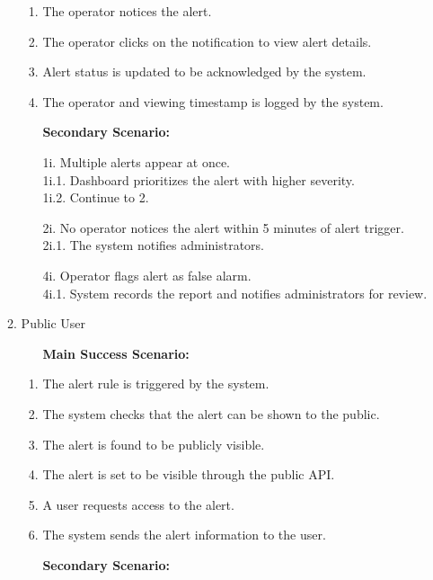 \documentclass[]{article}
\begin{document}
\begin{enumerate}[{\bf BE1.}]
\begin{enumerate}[{\bf VP1.}]
\begin{enumerate}[1.]
				\item The operator notices the alert.
				\item The operator clicks on the notification to view alert details.
				\item Alert status is updated to be acknowledged by the system.
				\item The operator and viewing timestamp is logged by the system.
			\end{enumerate}
			\begin{itemize}
				\item[] {\bf Secondary Scenario:}
				\item[1i.] Multiple alerts appear at once. \\
				\hspace{1cm}1i.1. Dashboard prioritizes the alert with higher severity. \\
				\hspace{1cm}1i.2. Continue to 2.
				\item[2i.] No operator notices the alert within 5 minutes of alert trigger. \\
				\hspace{1cm}2i.1. The system notifies administrators.
				\item[4i.] Operator flags alert as false alarm. \\
				\hspace{1cm}4i.1. System records the report and notifies administrators for review.
			\end{itemize}
		\item Public User
			\begin{itemize}
				\item[] {\bf Main Success Scenario:}
			\end{itemize}
			\begin{enumerate}[1.]
				\item The alert rule is triggered by the system.
				\item The system checks that the alert can be shown to the public.
				\item The alert is found to be publicly visible.
				\item The alert is set to be visible through the public API.
				\item A user requests access to the alert.
				\item The system sends the alert information to the user.
			\end{enumerate}
			\begin{itemize}
				\item[] {\bf Secondary Scenario:}

\end{itemize}
\end{enumerate}
\end{enumerate}
\end{document}
